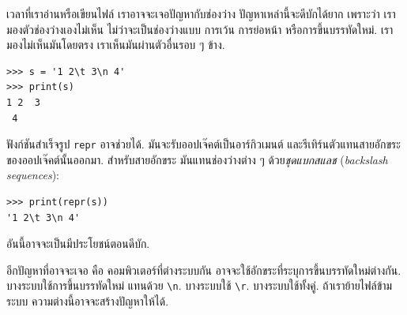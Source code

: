 
เวลาที่เราอ่านหรือเขียนไฟล์
เราอาจจะเจอปัญหากับช่องว่าง
ปัญหาเหล่านี้จะดีบักได้ยาก 
เพราะว่า เรามองตัวช่องว่างเองไม่เห็น
ไม่ว่าจะเป็นช่องว่างแบบ การเว้น การย่อหน้า หรือการขึ้นบรรทัดใหม่.
เรามองไม่เห็นมันโดยตรง เราเห็นมันผ่านตัวอื่นรอบ ๆ ข้าง.

\begin{verbatim}
>>> s = '1 2\t 3\n 4'
>>> print(s)
1 2	 3
 4
\end{verbatim}


ฟังก์ชันสำเร็จรูป \texttt{repr} อาจช่วยได้.
มันจะรับออปเจ๊คต์เป็นอาร์กิวเมนต์
และรีเทิร์นตัวแทนสายอักขระของออปเจ๊คต์นั้นออกมา.
สำหรับสายอักขระ
มันแทนช่องว่างต่าง ๆ ด้วย\textit{ชุดแบกสแลช} (\textit{backslash sequences}):

\begin{verbatim}
>>> print(repr(s))
'1 2\t 3\n 4'
\end{verbatim}

อันนี้อาจจะเป็นมีประโยชน์ตอนดีบัก.


อีกปัญหาที่อาจจะเจอ คือ คอมพิวเตอร์ที่ต่างระบบกัน อาจจะใช้อักขระที่ระบุการขึ้นบรรทัดใหม่ต่างกัน.
บางระบบใช้การขึ้นบรรทัดใหม่ แทนด้วย \verb|\n|.
บางระบบใช้ \verb|\r|.
บางระบบใช้ทั้งคู่.
ถ้าเราย้ายไฟล์ข้ามระบบ
ความต่างนี้อาจจะสร้างปัญหาให้ได้.



